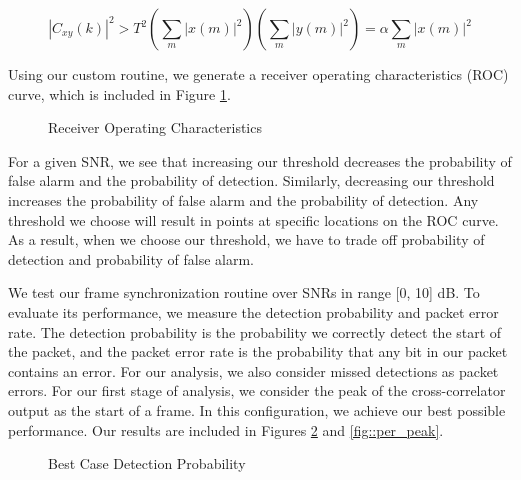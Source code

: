 \documentclass{article}
\begin{document}
\begin{equation}
	|C_{xy}(k)|^2 > T^2\left(\sum_m{|x(m)|^2}\right)\left(\sum_m{|y(m)|^2}\right) = \alpha\sum_m{|x(m)|^2}
\end{equation}

\noindent Using our custom routine, we generate a receiver operating characteristics (ROC) curve, which is included in Figure \ref{fig::roc_curve}.

\begin{figure}[H]
	\centerline{}
	\caption{Receiver Operating Characteristics}
	\label{fig::roc_curve}
\end{figure}

\noindent For a given SNR, we see that increasing our threshold decreases the probability of false alarm and the probability of detection. Similarly, decreasing our threshold increases the probability of false alarm and the probability of detection. Any threshold we choose will result in points at specific locations on the ROC curve. As a result, when we choose our threshold, we have to trade off probability of detection and probability of false alarm.

We test our frame synchronization routine over SNRs in range [0, 10] dB. To evaluate its performance, we measure the detection probability and packet error rate. The detection probability is the probability we correctly detect the start of the packet, and the packet error rate is the probability that any bit in our packet contains an error. For our analysis, we also consider missed detections as packet errors. For our first stage of analysis, we consider the peak of the cross-correlator output as the start of a frame. In this configuration, we achieve our best possible performance. Our results are included in Figures \ref{fig::detection_probability_peak} and \ref{fig::per_peak}.

\begin{figure}[H]
	\centerline{}
	\caption{Best Case Detection Probability}
	\label{fig::detection_probability_peak}
\end{figure}
\end{document}
